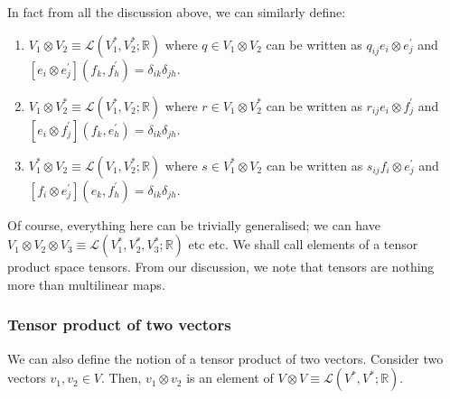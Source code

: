       In fact from all the discussion above, we can similarly define:
        \begin{enumerate}
          \item{$V_1 \otimes V_2 \equiv \mathcal{L}(V_1^*, V_2^*;
          \mathbb{R})$ where $q \in V_1 \otimes V_2$ can be written as
          $q_{ij}e_i \otimes e_j^\prime$ and $[e_i \otimes
          e_j^\prime](f_k,f^\prime_h) = \delta_{ik}\delta_{jh}$.}
          \item{$V_1 \otimes V_2^* \equiv \mathcal{L}(V_1^*, V_2;
          \mathbb{R})$ where $r \in V_1 \otimes V_2^*$ can be written as
          $r_{ij}e_i \otimes f_j^\prime$ and $[e_i \otimes
          f_j^\prime](f_k,e^\prime_h) = \delta_{ik}\delta_{jh}$.}
          \item{$V_1^* \otimes V_2 \equiv \mathcal{L}(V_1, V_2^*;
          \mathbb{R})$ where $s \in V_1^* \otimes V_2$ can be written as
          $s_{ij}f_i \otimes e_j^\prime$ and $[f_i \otimes
          e_j^\prime](e_k,f^\prime_h) = \delta_{ik}\delta_{jh}$.}
        \end{enumerate}
      
      Of course, everything here can be trivially generalised; we can have
      $V_1 \otimes V_2 \otimes V_3 \equiv
      \mathcal{L}(V_1^*,V_2^*,V_3^*;\mathbb{R})$ etc etc. We shall call
      elements of a tensor product space tensors. From our discussion, we
      note that tensors are nothing more than multilinear maps.
      \subsubsection{Tensor product of two vectors}
       We can also define the notion of a tensor product of two vectors.
       Consider two vectors $v_1,v_2 \in V$. Then, $v_1 \otimes v_2$ is an
       element of $V \otimes V \equiv \mathcal{L}(V^*,V^*;\mathbb{R})$.

